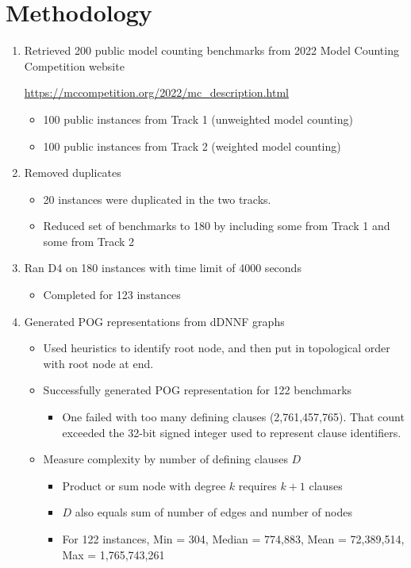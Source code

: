 \documentclass[twoside,11pt]{article}
\begin{document}
\section*{Methodology}
\begin{enumerate}
   \item Retrieved 200 public model counting benchmarks from 2022 Model Counting Competition website
     \begin{center}
       \url{https://mccompetition.org/2022/mc_description.html}
     \end{center}
     \begin{itemize}
     \item 100 public instances from Track 1 (unweighted model counting)
     \item 100 public instances from Track 2 (weighted model counting)
     \end{itemize}
   \item Removed duplicates
     \begin{itemize}
    \item  20 instances were duplicated in the two tracks.  
     \item Reduced set of benchmarks to 180 by including some from Track 1 and some from Track 2
     \end{itemize}
   \item Ran D4 on 180 instances with time limit of 4000 seconds
     \begin{itemize}
     \item Completed for 123 instances
     \end{itemize}
   \item Generated POG representations from dDNNF graphs
     \begin{itemize}
     \item Used heuristics to identify root node, and then put in topological order with root node at end.
     \item Successfully generated POG representation for 122 benchmarks
       \begin{itemize}
         \item One failed with too many defining clauses (2,761,457,765).  That count exceeded the 32-bit signed integer used to represent clause identifiers.
       \end{itemize}
       
     \item Measure complexity by number of defining clauses $D$
       \begin{itemize}
       \item Product or sum node with degree $k$ requires $k+1$ clauses
       \item $D$ also equals sum of number of edges and number of nodes
       \item For 122 instances, Min = 304, Median = 774,883, Mean = 72,389,514, Max = 1,765,743,261
       \end{itemize}


\end{itemize}
\end{enumerate}
\end{document}
